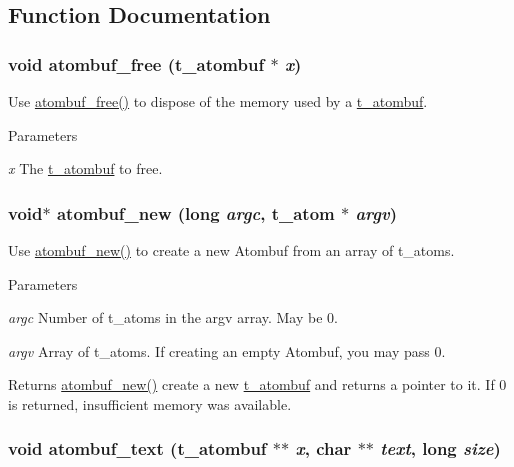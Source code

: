 \subsection{Function Documentation}
\hypertarget{group__atombuf_ga2c10483e31d84a12a037d154bd4051bd}{
\subsubsection[{atombuf\_\-free}]{\setlength{\rightskip}{0pt plus 5cm}void atombuf\_\-free ({\bf t\_\-atombuf} $\ast$ {\em x})}}
\label{group__atombuf_ga2c10483e31d84a12a037d154bd4051bd}


Use \hyperlink{group__atombuf_ga2c10483e31d84a12a037d154bd4051bd}{atombuf\_\-free()} to dispose of the memory used by a \hyperlink{structt__atombuf}{t\_\-atombuf}. 
\begin{DoxyParams}{Parameters}
\item[{\em x}]The \hyperlink{structt__atombuf}{t\_\-atombuf} to free. \end{DoxyParams}
\hypertarget{group__atombuf_ga5748a06a4e11f4be0b90dda8415bc815}{
\subsubsection[{atombuf\_\-new}]{\setlength{\rightskip}{0pt plus 5cm}void$\ast$ atombuf\_\-new (long {\em argc}, \/  {\bf t\_\-atom} $\ast$ {\em argv})}}
\label{group__atombuf_ga5748a06a4e11f4be0b90dda8415bc815}


Use \hyperlink{group__atombuf_ga5748a06a4e11f4be0b90dda8415bc815}{atombuf\_\-new()} to create a new Atombuf from an array of t\_\-atoms. 
\begin{DoxyParams}{Parameters}
\item[{\em argc}]Number of t\_\-atoms in the argv array. May be 0. \item[{\em argv}]Array of t\_\-atoms. If creating an empty Atombuf, you may pass 0. \end{DoxyParams}
\begin{DoxyReturn}{Returns}
\hyperlink{group__atombuf_ga5748a06a4e11f4be0b90dda8415bc815}{atombuf\_\-new()} create a new \hyperlink{structt__atombuf}{t\_\-atombuf} and returns a pointer to it. If 0 is returned, insufficient memory was available. 
\end{DoxyReturn}
\hypertarget{group__atombuf_gada864b7fc2e47dbdbef3176de00924a2}{
\subsubsection[{atombuf\_\-text}]{\setlength{\rightskip}{0pt plus 5cm}void atombuf\_\-text ({\bf t\_\-atombuf} $\ast$$\ast$ {\em x}, \/  char $\ast$$\ast$ {\em text}, \/  long {\em size})}}
\label{group__atombuf_gada864b7fc2e47dbdbef3176de00924a2}


